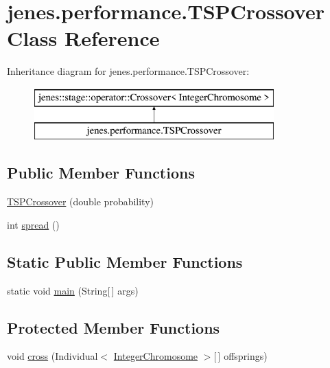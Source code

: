 \hypertarget{classjenes_1_1performance_1_1_t_s_p_crossover}{\section{jenes.\-performance.\-T\-S\-P\-Crossover Class Reference}
\label{classjenes_1_1performance_1_1_t_s_p_crossover}
}
Inheritance diagram for jenes.\-performance.\-T\-S\-P\-Crossover\-:\begin{figure}[H]
\begin{center}
\leavevmode
\includegraphics[height=2.000000cm]{classjenes_1_1performance_1_1_t_s_p_crossover}
\end{center}
\end{figure}
\subsection*{Public Member Functions}
\begin{DoxyCompactItemize}
\item 
\hyperlink{classjenes_1_1performance_1_1_t_s_p_crossover_a176bd2a0297786392cb4a8f5865cf97a}{T\-S\-P\-Crossover} (double probability)
\item 
int \hyperlink{classjenes_1_1performance_1_1_t_s_p_crossover_a08d867a3840e1c4ce0d9e57f5f21c839}{spread} ()
\end{DoxyCompactItemize}
\subsection*{Static Public Member Functions}
\begin{DoxyCompactItemize}
\item 
static void \hyperlink{classjenes_1_1performance_1_1_t_s_p_crossover_a13d3ceed0ac0f7ec8a8d428e511d5669}{main} (String\mbox{[}$\,$\mbox{]} args)
\end{DoxyCompactItemize}
\subsection*{Protected Member Functions}
\begin{DoxyCompactItemize}
\item 
void \hyperlink{classjenes_1_1performance_1_1_t_s_p_crossover_a8af2cecbf7cc09cd0836148d83f76fcf}{cross} (Individual$<$ \hyperlink{classjenes_1_1chromosome_1_1_integer_chromosome}{Integer\-Chromosome} $>$\mbox{[}$\,$\mbox{]} offsprings)
\end{DoxyCompactItemize}
